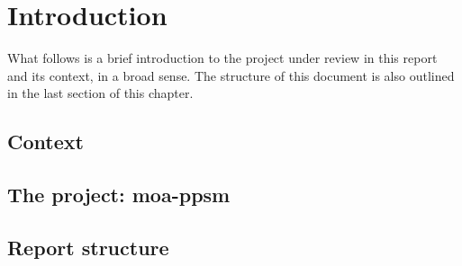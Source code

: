 \chapter{Introduction} %
\label{Chapter1Introduction} %


What follows is a brief introduction to the project under review in this report and its context,
in a broad sense. The structure of this document is also outlined in the last section of this chapter.

\section{Context}
\label{Introduction::Context}


\section{The project: moa-ppsm}
\label{Introduction::moa-ppsm}


\section{Report structure}
\label{Introduction::Structure}


